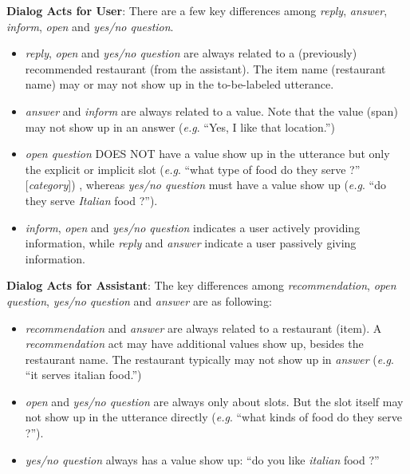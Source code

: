 \documentclass[11pt,a4paper]{article}
\makeatletter
\DeclareRobustCommand\onedot{\futurelet\@let@token\@onedot}
\def\onedot{. }
\def\eg{\emph{e.g}\onedot} \def\Eg{\emph{E.g}\onedot}
\makeatother
\begin{document}
\noindent \textbf{Dialog Acts for User}: There are a few key differences among \textit{reply}, \textit{answer}, \textit{inform}, \textit{open} and \textit{yes/no question}.

\begin{itemize}
\itemsep0em
    \item \textit{reply}, \textit{open} and \textit{yes/no question} are always related to a (previously) recommended restaurant (from the assistant). The item name (restaurant name) may or may not show up in the to-be-labeled utterance.
    \item \textit{answer} and \textit{inform} are always related to a value. Note that the value (span) may not show up in an answer (\eg  ``Yes, I like that location.'')
    \item \textit{open question} DOES NOT have a value show up in the utterance but only the explicit or implicit slot (\eg ``what type of food do they serve ?'' [\textit{category}])
    , whereas \textit{yes/no question} must have a value show up (\eg ``do they serve \textit{Italian} food ?'').
    \item \textit{inform}, \textit{open} and \textit{yes/no question} indicates a user actively providing information, while \textit{reply} and \textit{answer} indicate a user passively giving information.
\end{itemize}

\noindent \textbf{Dialog Acts for Assistant}: The key differences among \textit{recommendation}, \textit{open question}, \textit{yes/no question} and \textit{answer} are as following:
\begin{itemize}
\itemsep0em
    \item \textit{recommendation} and \textit{answer} are always related to a restaurant (item). A \textit{recommendation} act may have additional values show up, besides the restaurant name.
    The restaurant typically may not show up in \textit{answer} (\eg ``it serves italian food.'')
    \item \textit{open} and \textit{yes/no question} are always only about slots. But the slot itself may not show up in the utterance directly (\eg ``what kinds of food do they serve ?'').
    \item \textit{yes/no question} always has a value show up: ``do you like \textit{italian} food ?''
\end{itemize}
\end{document}

